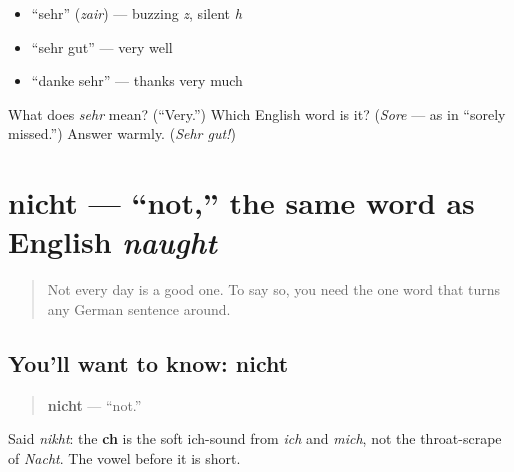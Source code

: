 \begin{itemize}
\raggedright
  \item \textquotedblleft{}sehr\textquotedblright{} (\emph{zair}) — buzzing \emph{z}, silent \emph{h}
  \item \textquotedblleft{}sehr gut\textquotedblright{} — very well
  \item \textquotedblleft{}danke sehr\textquotedblright{} — thanks very much
\end{itemize}

\begin{tcolorbox}[breakable,colback=teal!4,colframe=teal!35!black,title={Before you move on}]
What does \emph{sehr} mean? (\textquotedblleft{}Very.\textquotedblright{}) Which English word is it? (\emph{Sore} — as in \textquotedblleft{}sorely missed.\textquotedblright{}) Answer warmly. (\emph{Sehr gut!})
\end{tcolorbox}
\section[nicht]{nicht — \textquotedblleft{}not,\textquotedblright{} the same word as English \emph{naught}}

\label{lesson:GE-C03-nicht}



\begin{quote}
Not every day is a good one. To say so, you need the one word that turns any German sentence around.
\end{quote}

\subsection*{You'll want to know: nicht}
\begin{quote}
\textbf{nicht} — \textquotedblleft{}not.\textquotedblright{}
\end{quote}

Said \emph{nikht}: the \textbf{ch} is the soft ich-sound from \emph{ich} and \emph{mich}, not the throat-scrape of \emph{Nacht}. The vowel before it is short.

